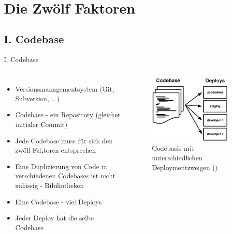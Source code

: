 \documentclass{beamer}
\begin{document}
		\section{Die Zwölf Faktoren}
			\subsection{I. Codebase}
				\begin{frame}{I. Codebase}
					\begin{columns}
							\begin{itemize}
								\item Versionsmanagementsystem (Git, Subversion, ...)
								\item Codebase - ein Repository (gleicher initialer Commit)
								\item Jede Codebase muss für sich den zwölf Faktoren entsprechen
								\item Eine Duplizierung von Code in verschiedenen Codebases ist nicht zulässig - Bibiliotheken
								\item Eine Codebase - viel Deploys
								\item Jeder Deploy hat die selbe Codebase
							\end{itemize}
						\begin{figure}
							\includegraphics[width=\textwidth]{codebase-deploys.png}
							\caption{Codebasis mit unterschiedlichen Deploymentzweigen (\cite{factor-codebase})}
						\end{figure}
					\end{columns}
				\end{frame}
\end{document}
